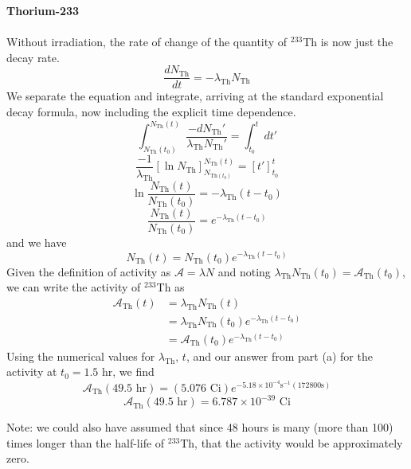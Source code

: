 \documentclass{report}
\begin{document}
\begin{enumerate}[a)]
\textbf{Thorium-233}\\
\-\\
Without irradiation, the rate of change of the quantity of $^{233}$Th is now just the decay rate. 
$$ \frac{dN_{\text{Th}}}{dt} = -\lambda_{\text{Th}}N_{\text{Th}} $$
We separate the equation and integrate, arriving at the standard exponential decay formula, now including the explicit time dependence.
$$ \int_{N_{\text{Th}}(t_0)}^{N_{\text{Th}}(t)} \frac{-dN_{\text{Th}}'}{\lambda_{\text{Th}}N_{\text{Th}}'} = \int_{t_0}^{t} dt' $$
$$ \frac{-1}{\lambda_{\text{Th}}}\left[ \ln{N_{\text{Th}}} \right]_{N_{\text{Th}(t_0)}}^{N_{\text{Th}}(t)} = \left[t'\right]_{t_0}^{t} $$
$$ \ln\frac{N_{\text{Th}}(t)}{N_{\text{Th}}(t_0)}  = -\lambda_{\text{Th}}(t-t_0) $$
$$ \frac{N_{\text{Th}}(t)}{N_{\text{Th}}(t_0)}  = e^{-\lambda_{\text{Th}}(t-t_0)} $$
and we have 
$$ N_{\text{Th}}(t) = N_{\text{Th}}(t_0) e^{-\lambda_{\text{Th}}\left(t-t_0\right)} $$
Given the definition of activity as $\mathcal{A} = \lambda N$ and noting $\lambda_{\text{Th}} N_{\text{Th}}(t_0) = \mathcal{A}_{\text{Th}}(t_0)$, we can write the activity of $^{233}$Th as
\begin{align*}
\mathcal{A}_{\text{Th}}(t)	&= \lambda_{\text{Th}} N_{\text{Th}}(t) \\
							&= \lambda_{\text{Th}} N_{\text{Th}}(t_0) e^{-\lambda_{\text{Th}}(t-t_0)} \\ 
							&= \mathcal{A}_{\text{Th}}(t_0) e^{-\lambda_{\text{Th}}(t-t_0)}
\end{align*}
Using the numerical values for $\lambda_{\text{Th}}$, $t$, and our answer from part (a) for the activity at $t_0=1.5$ hr, we find
$$ \mathcal{A}_{\text{Th}}(49.5\text{ hr}) = (5.076 \text{ Ci})e^{-5.18\times10^{-4}\text{s}^{-1} (172800\text{s})} $$
$$ \boxed{\mathcal{A}_{\text{Th}}(49.5\text{ hr}) = 6.787\times10^{-39}\text{ Ci}} $$

{\small Note: we could also have assumed that since 48 hours is many (more than 100) times longer than the half-life of $^{233}$Th, that the activity would be approximately zero.}
\-\\
\-\\


\end{enumerate}
\end{document}
